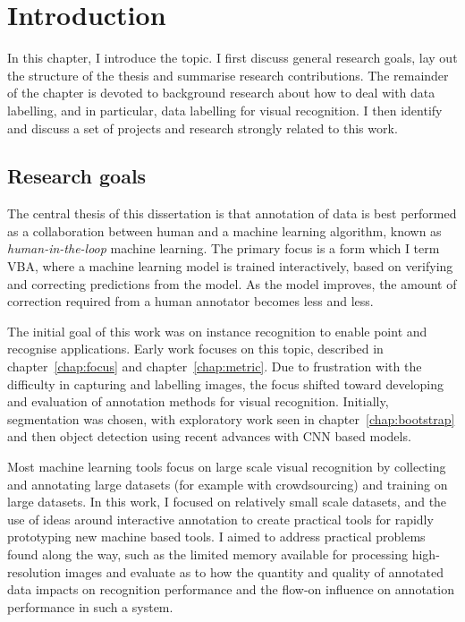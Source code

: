 \chapter{Introduction}
\label{chap:introduction}

In this chapter, I introduce the topic. I first discuss general research goals, lay out the structure of the thesis and summarise research contributions. The remainder of the chapter is devoted to background research about how to deal with data labelling, and in particular, data labelling for visual recognition. I then identify and discuss a set of projects and research strongly related to this work. 


\section{Research goals}
\label{sec:research_goals}

The central thesis of this dissertation is that annotation of data is best performed as a collaboration between human and a machine learning algorithm, known as \emph{human-in-the-loop} machine learning. The primary focus is a form which I term \gls{VBA}, where a machine learning model is trained interactively, based on verifying and correcting predictions from the model. As the model improves, the amount of correction required from a human annotator becomes less and less. 

The initial goal of this work was on instance recognition to enable point and recognise applications. Early work focuses on this topic, described in chapter~\ref{chap:focus} and chapter~\ref{chap:metric}. Due to frustration with the difficulty in capturing and labelling images, the focus shifted toward developing and evaluation of annotation methods for visual recognition.  Initially, segmentation was chosen, with exploratory work seen in chapter~\ref{chap:bootstrap} and then object detection using recent advances with \gls{CNN} based models.

Most machine learning tools focus on large scale visual recognition by collecting and annotating large datasets (for example with crowdsourcing) and training on large datasets. In this work, I focused on relatively small scale datasets, and the use of ideas around interactive annotation to create practical tools for rapidly prototyping new machine based tools. I aimed to address practical problems found along the way, such as the limited memory available for processing high-resolution images and evaluate as to how the quantity and quality of annotated data impacts on recognition performance and the flow-on influence on annotation performance in such a system.

